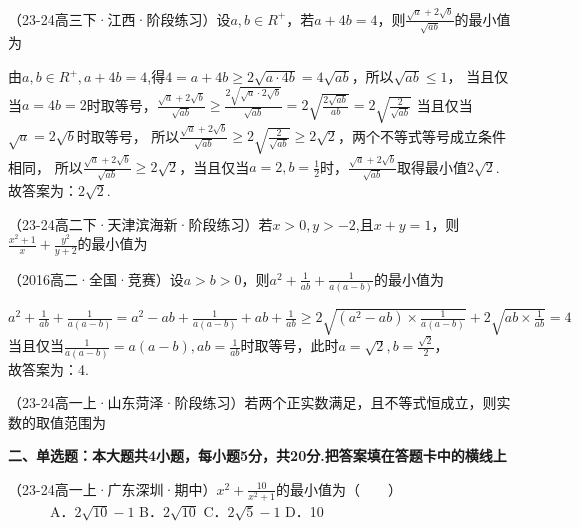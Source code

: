 \begin{hmwk}
    （23-24高三下·江西·阶段练习）设$a,b\in R^+$，若$a+4b=4$，则$\displaystyle \frac{\sqrt{a}+2\sqrt{b}}{\sqrt{ab}}$的最小值为
    \begin{jiexi}
        由$a,b\in R^+,a+4b=4$,得$4=a+4b\ge2\sqrt{a \cdot 4b}=4\sqrt{ab}$，所以$\sqrt{ab}\le 1$，
当且仅当$a=4b=2$时取等号，$\displaystyle \frac{\sqrt{a}+2\sqrt{b}}{\sqrt{ab}}\ge \frac{2\sqrt{\sqrt{a}\cdot 2\sqrt{b}}}{\sqrt{ab}}=
2\sqrt{\frac{2\sqrt{ab}}{ab}}=2\sqrt{\frac{2}{\sqrt{ab}}}$
当且仅当$\sqrt{a}=2\sqrt{b}$时取等号，
所以$\displaystyle \frac{\sqrt{a}+2\sqrt{b}}{\sqrt{ab}}\ge2\sqrt{\frac{2}{\sqrt{ab}}}\ge2\sqrt{2}$，两个不等式等号成立条件相同，
所以$\displaystyle \frac{\sqrt{a}+2\sqrt{b}}{\sqrt{ab}}\ge2\sqrt{2}$，当且仅当$\displaystyle a=2,b=\frac{1}{2}$时，$\displaystyle \frac{\sqrt{a}+2\sqrt{b}}{\sqrt{ab}}$取得最小值$2\sqrt{2}$.\\
故答案为：$2\sqrt{2}$.
    \end{jiexi}
\end{hmwk}

\begin{hmwk}
    （23-24高二下·天津滨海新·阶段练习）若$x>0,y>-2$,且$x+y=1$，则$\frac{x^2+1}{x}+\frac{y^2}{y+2}$的最小值为
\end{hmwk}

\begin{hmwk}
    （2016高二·全国·竞赛）设$a>b>0$，则$\displaystyle a^2+\frac{1}{ab}+\frac{1}{a(a-b)}$的最小值为
    \begin{jiexi}
        $\displaystyle a^2+\frac{1}{ab}+\frac{1}{a(a-b)}=a^2-ab+\frac{1}{a(a-b)}+ab+\frac{1}{ab}\ge 2\sqrt{(a^2-ab)\times \frac{1}{a(a-b)}}+2\sqrt{ab\times\frac{1}{ab}}=4$\\
        当且仅当$\frac{1}{a(a-b)}=a(a-b),ab=\frac{1}{ab}$时取等号，此时$\displaystyle a=\sqrt{2},b=\frac{\sqrt{2}}{2}$，\\
故答案为：4.
    \end{jiexi}
\end{hmwk}

\begin{hmwk}
    （23-24高一上·山东菏泽·阶段练习）若两个正实数满足，且不等式恒成立，则实数的取值范围为
\end{hmwk}
\textbf{二、单选题：本大题共4小题，每小题5分，共20分.把答案填在答题卡中的横线上}
\begin{hmwk}
    （23-24高一上·广东深圳·期中）$\displaystyle x^2+\frac{10}{x^2+1}$的最小值为（    ）\\
          A．$2\sqrt{10}-1$ \quad\quad	B．$2\sqrt{10}$ \quad\quad	C．$2\sqrt{5}-1$ \quad\quad	D．10
\end{hmwk}

